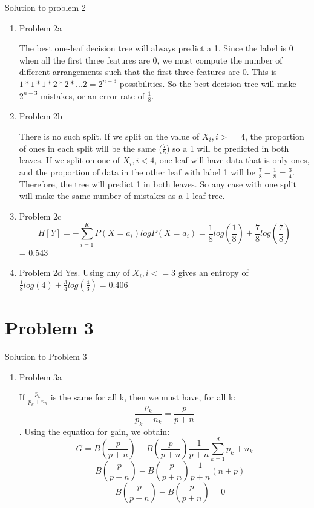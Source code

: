 \documentclass[11pt]{article}
\newcommand{\solution}[1]{{{\color{blue}{\bf Solution:} {#1}}}}
\begin{document}
\solution{Solution to problem 2}
\begin{enumerate}
\item Problem 2a

\solution{
The best one-leaf decision tree will always predict a 1. Since the label is 0 when all the first three features are 0, we must compute the number of different arrangements such that the first three features are 0. This is $ 1 * 1 * 1 * 2 * 2 * ... 2 = 2^{n-3} $ possibilities. So the best decision tree will make $ 2^{n-3} $ mistakes, or an error rate of $ \frac{1}{8} $.
}

\vspace{1cm}
\item Problem 2b

\solution{
There is no such split. If we split on the value of $ X_i, i >=4$, the proportion of ones in each split will be the same ($\frac{7}{8}$) so a 1 will be predicted in both leaves. If we split on one of $X_i, i < 4 $, one leaf will have data that is only ones, and the proportion of data in the other leaf with label 1 will be $ \frac{7}{8} - \frac{1}{8} = \frac{3}{4} $. Therefore, the tree will predict 1 in both leaves. So any case with one split will make the same number of mistakes as a 1-leaf tree. 
}
\vspace{1cm}
\item Problem 2c
\solution{
\[ H[Y] = - \sum_{i = 1}^{K} P(X = a_i) log P(X = a_i) = \frac{1}{8}log(\frac{1}{8}) + \frac{7}{8}log(\frac{7}{8}) \] = 0.543
}

\vspace{1cm}
\item Problem 2d
\solution{
Yes. Using any of $ X_i, i <= 3 $ gives an entropy of $ \frac{1}{8}log(4) + \frac{3}{4}log(\frac{4}{3}) = 0.406 $
}
\end{enumerate}
\newpage
\section{Problem 3}
\solution{Solution to Problem 3}
\begin{enumerate}
\item Problem 3a
\solution{If $\frac{p_k}{p_k + n_k}$ is the same for all k, then we must have, for all k: \[\frac{p_k}{p_k + n_k} = \frac{p}{p + n} \]. Using the equation for gain, we obtain: \[G = B(\frac{p}{p + n}) - B(\frac{p}{p + n})\frac{1}{p + n} \sum_{k = 1}^{d} p_k + n_k \]
\[ = B(\frac{p}{p + n}) - B(\frac{p}{p + n})\frac{1}{p + n}(n + p) \]
\[ = B(\frac{p}{p + n}) - B(\frac{p}{p + n}) = 0 \]


}
\end{enumerate}
\newpage
\end{document}
